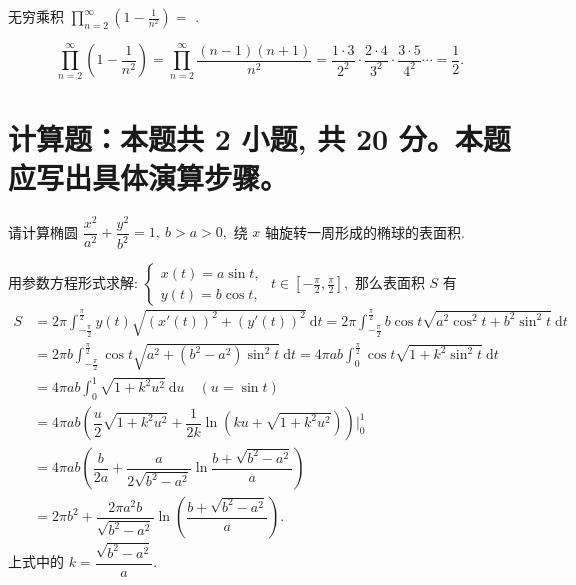 \begin{question}
无穷乘积 $\prod_{n=2}^\infty \left( 1 - \frac{1}{n^2} \right) =$ \fillin[$1/2$].
\end{question}

\begin{solution}
\[
\prod_{n=2}^\infty \left( 1 - \frac{1}{n^2} \right) = \prod_{n=2}^\infty \frac{(n-1)(n+1)}{n^2} = \frac{1 \cdot 3}{2^2} \cdot \frac{2 \cdot 4}{3^2} \cdot \frac{3 \cdot 5}{4^2} \cdots = \frac{1}{2}.
\]
\end{solution}


\showquestionpoints
\section{计算题：本题共 2 小题, 共 20 分。本题应写出具体演算步骤。}


\begin{question}[points = 10]
请计算椭圆 $\displaystyle \dfrac{x^2}{a^2} + \dfrac{y^2}{b^2} = 1, ~ b > a > 0,$ 绕 $x$ 轴旋转一周形成的椭球的表面积.

\end{question}

\begin{solution}
用参数方程形式求解: $\begin{cases} x(t) = a \sin t, \\ y(t) = b \cos t,\end{cases}$ $t \in \left[ -\frac{\pi}{2}, \frac{\pi}{2} \right],$ 那么表面积 $S$ 有
\begin{align*}
S & = 2\pi \int_{-\frac{\pi}{2}}^{\frac{\pi}{2}} y(t) \sqrt{(x'(t))^2 + (y'(t))^2} ~ \mathrm{d}t = 2\pi \int_{-\frac{\pi}{2}}^{\frac{\pi}{2}} b \cos t \sqrt{a^2 \cos^2 t + b^2 \sin^2 t} ~ \mathrm{d}t \\
& = 2\pi b \int_{-\frac{\pi}{2}}^{\frac{\pi}{2}} \cos t \sqrt{a^2 + (b^2 - a^2)\sin^2 t} ~ \mathrm{d}t = 4\pi ab \int_{0}^{\frac{\pi}{2}} \cos t \sqrt{1 + k^2 \sin^2 t} ~ \mathrm{d}t \\
& = 4\pi ab \int_{0}^{1} \sqrt{1 + k^2 u^2} ~ \mathrm{d}u \quad (u = \sin t) \\
& = 4\pi ab \left( \dfrac{u}{2} \sqrt{1 + k^2 u^2} + \dfrac{1}{2k} \ln\left( k u + \sqrt{1 + k^2 u^2} \right) \right) \bigg|_{0}^{1} \\
& = 4\pi ab \left( \dfrac{b}{2a} + \dfrac{a}{2\sqrt{b^2 - a^2}} \ln\dfrac{b + \sqrt{b^2 - a^2}}{a} \right) \\
& = 2\pi b^2 + \dfrac{2\pi a^2 b}{\sqrt{b^2 - a^2}} \ln\left( \dfrac{b + \sqrt{b^2 - a^2}}{a} \right).
\end{align*}
上式中的 $k = \dfrac{\sqrt{b^2 - a^2}}{a}.$
\end{solution}


